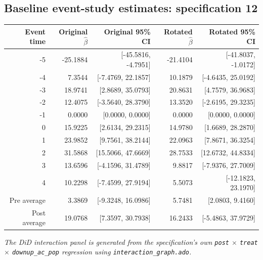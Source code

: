 \documentclass[10pt]{article}
\begin{document}
\subsection*{Baseline event-study estimates: specification 12}
\begin{center}
\scriptsize
\begin{tabular}{r rr rr}
\toprule
Event time & Original $\hat\beta$ & Original 95\% CI & Rotated $\hat\beta$ & Rotated 95\% CI \\
\midrule
-5 & -25.1884 & [-45.5816, -4.7951] & -21.4104 & [-41.8037, -1.0172] \\
-4 & 7.3544 & [-7.4769, 22.1857] & 10.1879 & [-4.6435, 25.0192] \\
-3 & 18.9741 & [2.8689, 35.0793] & 20.8631 & [4.7579, 36.9683] \\
-2 & 12.4075 & [-3.5640, 28.3790] & 13.3520 & [-2.6195, 29.3235] \\
-1 & 0.0000 & [0.0000, 0.0000] & 0.0000 & [0.0000, 0.0000] \\
0 & 15.9225 & [2.6134, 29.2315] & 14.9780 & [1.6689, 28.2870] \\
1 & 23.9852 & [9.7561, 38.2144] & 22.0963 & [7.8671, 36.3254] \\
2 & 31.5868 & [15.5066, 47.6669] & 28.7533 & [12.6732, 44.8334] \\
3 & 13.6596 & [-4.1596, 31.4789] & 9.8817 & [-7.9376, 27.7009] \\
4 & 10.2298 & [-7.4599, 27.9194] & 5.5073 & [-12.1823, 23.1970] \\
\midrule
Pre average & 3.3869 & [-9.3248, 16.0986] & 5.7481 & [2.0803, 9.4160] \\
Post average & 19.0768 & [7.3597, 30.7938] & 16.2433 & [-5.4863, 37.9729] \\
\bottomrule
\end{tabular}
\end{center}
\medskip
\textit{The DiD interaction panel is generated from the specification's own \texttt{post} $\times$ \texttt{treat} $\times$ \texttt{downup\_ac\_pop} regression using \texttt{interaction\_graph.ado}.}
\clearpage
\end{document}
